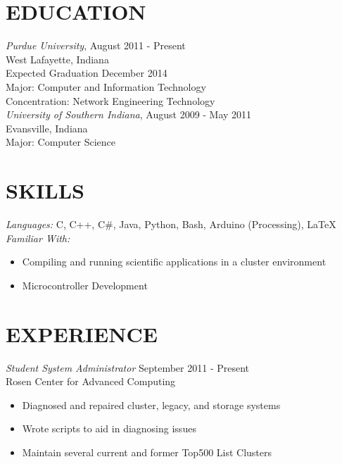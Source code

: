 \documentclass[line,margin]{res}
\begin{document}
\address{maddene@purdue.edu}
\address{(812) 250-1419}
 
\begin{resume}
\section{EDUCATION} 

				{\sl Purdue University}, \hfill August 2011 - Present \\
                West Lafayette, Indiana \\
                Expected Graduation December 2014 \\
                Major: Computer and Information Technology \\
                Concentration: Network Engineering Technology \\ 
                
        {\sl University of Southern Indiana}, \hfill August 2009 - May 2011 \\
                Evansville, Indiana \\
                Major: Computer Science\\
                
 
\section{SKILLS} 
				{\sl Languages:}  C, C++, C\#, Java, Python, Bash, Arduino (Processing), \LaTeX \\
				{\sl Familiar With:} 
                \begin{itemize} \itemsep -2pt %
                  \item Compiling and running scientific applications in a cluster environment
                  \item Microcontroller Development
                \end{itemize}
 
\section{EXPERIENCE} 
				{\sl Student System Administrator} \hfill September 2011 - Present \\
                Rosen Center for Advanced Computing
                \begin{itemize}  \itemsep -2pt %
                  \item Diagnosed and repaired cluster, legacy, and storage systems
                  \item Wrote scripts to aid in diagnosing issues
                  \item Maintain several current and former Top500 List Clusters
                \end{itemize}


\end{resume}
\end{document}
